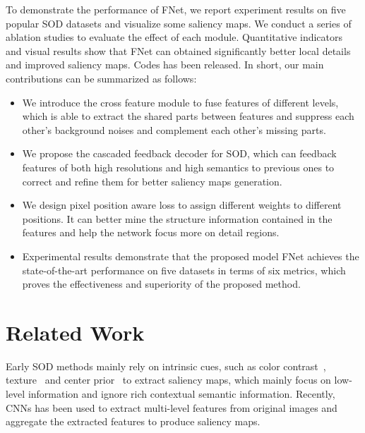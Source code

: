\documentclass[letterpaper]{article} \usepackage{aaai20}  \usepackage{times}  \usepackage{helvet} \usepackage{courier}  \usepackage[hyphens]{url}  \usepackage{graphicx} \urlstyle{rm} \def\UrlFont{\rm}  \usepackage{graphicx}  \frenchspacing  \setlength{\pdfpagewidth}{8.5in}  \setlength{\pdfpageheight}{11in}
\begin{document}
To demonstrate the performance of FNet, we report experiment results on five popular SOD datasets and visualize some saliency maps. We conduct a series of ablation studies to evaluate the effect of each module. Quantitative indicators and visual results show that FNet can obtained significantly better local details and improved saliency maps. Codes has been released. In short, our main contributions can be summarized as follows:
\begin{itemize}
  \item We introduce the cross feature module to fuse features of different levels, which is able to extract the shared parts between features and suppress each other's background noises and complement each other's missing parts.
  \item We propose the cascaded feedback decoder for SOD, which can feedback features of both high resolutions and high semantics to previous ones to correct and refine them for better saliency maps generation.
  \item We design pixel position aware loss to assign different weights to different positions. It can better mine the structure information contained in the features and help the network focus more on detail regions.
  \item Experimental results demonstrate that the proposed model FNet achieves the state-of-the-art performance on five datasets in terms of six metrics, which proves the effectiveness and superiority of the proposed method.
\end{itemize}

\section{Related Work}
Early SOD methods mainly rely on intrinsic cues, such as color contrast~\cite{ChengMHTH15}, texture~\cite{ECSSD} and center prior~\cite{JiangD13} to extract saliency maps, which mainly focus on low-level information and ignore rich contextual semantic information. Recently, CNNs has been used to extract multi-level features from original images and aggregate the extracted features to produce saliency maps. 
\end{document}

